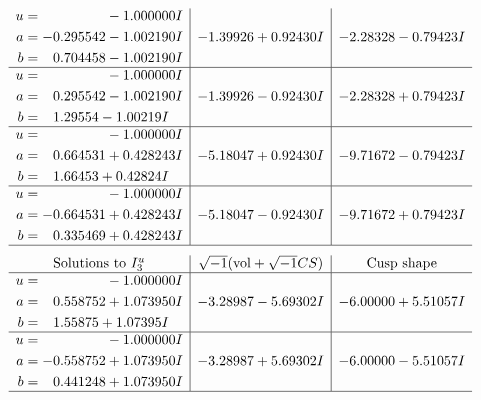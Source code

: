 \documentclass[1p]{elsarticle_modified}
\theoremstyle{definition}
\newcommand{\I}{\sqrt{-1}}
\begin{document}
$$\begin{array}{c|c|c}
\begin{aligned}
u &= \phantom{-0.000000 } -1.000000 I \\
a &= -0.295542 - 1.002190 I \\
b &= \phantom{-}0.704458 - 1.002190 I\end{aligned}
 & -1.39926 + 0.92430 I & -2.28328 - 0.79423 I \\ \hline\begin{aligned}
u &= \phantom{-0.000000 } -1.000000 I \\
a &= \phantom{-}0.295542 - 1.002190 I \\
b &= \phantom{-}1.29554 - 1.00219 I\end{aligned}
 & -1.39926 - 0.92430 I & -2.28328 + 0.79423 I \\ \hline\begin{aligned}
u &= \phantom{-0.000000 } -1.000000 I \\
a &= \phantom{-}0.664531 + 0.428243 I \\
b &= \phantom{-}1.66453 + 0.42824 I\end{aligned}
 & -5.18047 + 0.92430 I & -9.71672 - 0.79423 I \\ \hline\begin{aligned}
u &= \phantom{-0.000000 } -1.000000 I \\
a &= -0.664531 + 0.428243 I \\
b &= \phantom{-}0.335469 + 0.428243 I\end{aligned}
 & -5.18047 - 0.92430 I & -9.71672 + 0.79423 I\\
 \hline 
 \end{array}$$\newpage$$\begin{array}{c|c|c}  
\text{Solutions to }I^u_{3}& \I (\text{vol} + \sqrt{-1}CS) & \text{Cusp shape}\\
 \hline 
\begin{aligned}
u &= \phantom{-0.000000 } -1.000000 I \\
a &= \phantom{-}0.558752 + 1.073950 I \\
b &= \phantom{-}1.55875 + 1.07395 I\end{aligned}
 & -3.28987 - 5.69302 I & -6.00000 + 5.51057 I \\ \hline\begin{aligned}
u &= \phantom{-0.000000 } -1.000000 I \\
a &= -0.558752 + 1.073950 I \\
b &= \phantom{-}0.441248 + 1.073950 I\end{aligned}
 & -3.28987 + 5.69302 I & -6.00000 - 5.51057 I\\
 \hline 
 \end{array}$$\newpage
\end{document}
